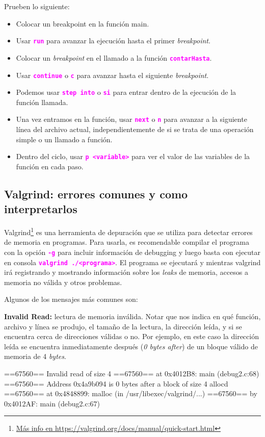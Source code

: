\documentclass[]{scrartcl}
\newcommand{\hl}[1]{\textcolor{magenta}{\textbf{\texttt{#1}}}}
\begin{document}
Prueben lo siguiente:

\begin{itemize}
  \item Colocar un breakpoint en la función main.
  \item Usar \hl{run} para avanzar la ejecución hasta el primer \textit{breakpoint}.
  \item Colocar un \textit{breakpoint} en el llamado a la función \hl{contarHasta}.
  \item Usar \hl{continue} o \hl{c} para avanzar hasta el siguiente \textit{breakpoint}.
  \item Podemos usar \hl{step into} o \hl{si} para entrar dentro de la ejecución de la función llamada. 
  \item Una vez entramos en la función, usar \hl{next} o \hl{n} para avanzar a la siguiente línea del archivo actual, independientemente de si se trata de una operación simple o un llamado a función.
  \item Dentro del ciclo, usar \hl{p <variable>} para ver el valor de las variables de la función en cada paso.
\end{itemize}

\subsection*{Valgrind: errores comunes y como interpretarlos}

Valgrind\footnote{\url{Más info en https://valgrind.org/docs/manual/quick-start.html}} es una herramienta de depuración que se utiliza para detectar errores de memoria en programas.
Para usarla, es recomendable compilar el programa con la opción \hl{-g} para incluir información de debugging y luego basta con ejecutar en consola \hl{valgrind ./<programa>}.
El programa se ejecutará y mientras valgrind irá registrando y mostrando información sobre los \textit{leaks} de memoria, accesos a memoria no válida y otros problemas.

Algunos de los mensajes más comunes son:

\textbf{Invalid Read:} lectura de memoria inválida. Notar que nos indica en qué función, archivo y línea se produjo, el tamaño de la lectura, la dirección leída, y si se encuentra cerca de direcciones válidas o no. Por ejemplo, en este caso la dirección leída se encuentra inmediatamente después (\textit{0 bytes after}) de un bloque válido de memoria de 4 \textit{bytes}.
\begin{bashbox}[]
  ==67560== Invalid read of size 4
  ==67560==    at 0x4012B8: main (debug2.c:68)
  ==67560==  Address 0x4a9b094 is 0 bytes after a block of size 4 allocd
  ==67560==    at 0x4848899: malloc (in /usr/libexec/valgrind/...)
  ==67560==    by 0x4012AF: main (debug2.c:67)
\end{bashbox}
\end{document}
